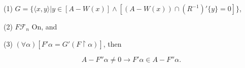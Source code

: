 (1) $G = \{ \langle x, y \rangle | y \in [A - W(x)] \land [(A - W(x)) \cap (R^{-1})' \{y\} = 0] \}$,

(2) $F \mathcal{F}_n$ On, and

(3) $(\forall \alpha)[F' \alpha = G'(F \upharpoonright \alpha)]$, then

$$A - F'' \alpha \neq 0 \rightarrow F' \alpha \in A - F'' \alpha.$$
